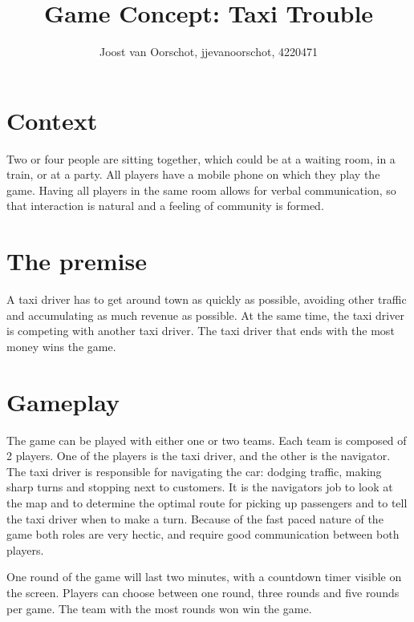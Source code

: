 \documentclass[11pt,twoside,a4paper]{article}
\title{Game Concept: Taxi Trouble} %
\author{
        Joost van Oorschot, jjevanoorschot, 4220471
}
\begin{document}
\maketitle


\section*{Context}
Two or four people are sitting together, which could be at a waiting room, in a train, or at a party. All players have a mobile phone on which they play the game. Having all players in the same room allows for verbal communication, so that interaction is natural and a feeling of community is formed.

\section*{The premise}
A taxi driver has to get around town as quickly as possible, avoiding other traffic and accumulating as much revenue as possible. At the same time, the taxi driver is competing with another taxi driver. The taxi driver that ends with the most money wins the game.

\section*{Gameplay}
The game can be played with either one or two teams. Each team is composed of 2 players. One of the players is the taxi driver, and the other is the navigator. The taxi driver is responsible for navigating the car: dodging traffic, making sharp turns and stopping next to customers. It is the navigators job to look at the map and to determine the optimal route for picking up passengers and to tell the taxi driver when to make a turn. Because of the fast paced nature of the game both roles are very hectic, and require good communication between both players.

One round of the game will last two minutes, with a countdown timer visible on the screen. Players can choose between one round, three rounds and five rounds per game. The team with the most rounds won win the game.
\end{document}
